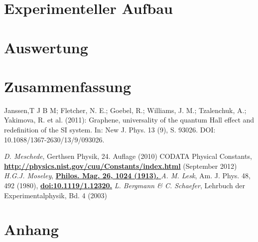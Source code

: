 \documentclass[paper=a4,fontsize=10pt,DIV=18,twocolumn,parskip=half]{scrartcl}
\numberwithin{equation}{section}    %
\begin{document}
\section{Experimenteller Aufbau}
%

\label{Experiment}
%
\section{Auswertung}
%






%
\section{Zusammenfassung}
%

%
\begin{thebibliography}{}   
%
%
   Janssen,T J B M; Fletcher, N. E.; Goebel, R.; Williams, J. M.; Tzalenchuk, A.; Yakimova, R. et al. (2011): Graphene, universality of the quantum Hall effect and redefinition of the SI system. In: New J. Phys. 13 (9), S. 93026. DOI: 10.1088/1367-2630/13/9/093026.

   \textit{D. Meschede}, Gerthsen Physik, 24. Auflage (2010) 
   CODATA Physical Constants,
    \textbf{\url{http://physics.nist.gov/cuu/Constants/index.html}} 
    (September 2012)
   \textit{H.G.J. Moseley},
  \href{http://www.chemistry.co.nz/henry_moseley_article.htm}{\textbf{{Philos.
        Mag. 26, 1024 (1913).  }}} 
   \textit{A. M. Lesk}, Am. J. Phys. 48, 492 (1980),
    \href{http://ajp.aapt.org/resource/1/ajpias/v48/i6/p492_s1?ver=pdfcov}
    {\textbf{doi:10.1119/1.12320.}}
     \textit{L. Bergmann \& C. Schaefer}, Lehrbuch der
    Experimentalphysik, Bd. 4 (2003)
\end{thebibliography}
%
%
\onecolumn
\pagestyle{empty}
\section{Anhang}
\label{Anhang}
\end{document}
